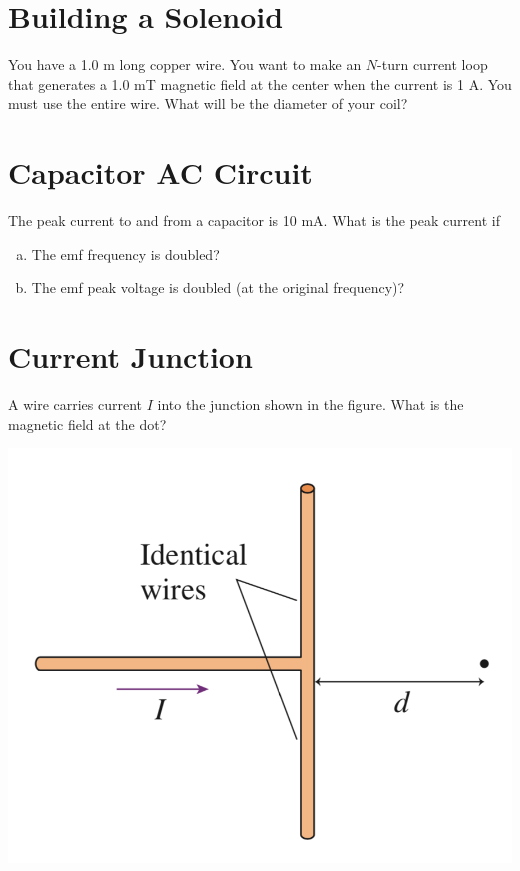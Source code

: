 \documentclass[12pt]{article}
\begin{document}
\vspace{1in}
\section{Building a Solenoid}
 You have a 1.0 m long copper wire. You want to make an $N$-turn current loop that generates a 1.0 mT magnetic field at the center when the current is 1 A. You must use the entire wire.
What will be the diameter of your coil?

\newpage
\section{Capacitor AC Circuit}

The peak current to and from a capacitor is 10 mA. What is the peak current if
\begin{enumerate}[(a)]
	\item The emf frequency is doubled?
	\item The emf peak voltage is doubled (at the original frequency)?
\end{enumerate}

\vspace{2in}
\section{Current Junction}


A wire carries current $I$ into the junction shown in the figure. What is the magnetic field at the dot?
\begin{center}
\includegraphics[width=.5\linewidth]{final-fig4}
\end{center}
\end{document}
